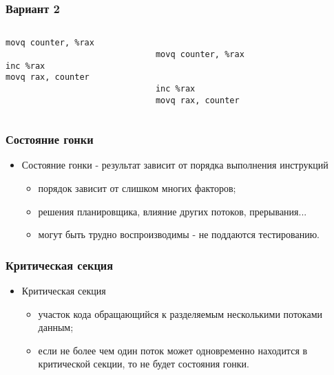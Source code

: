 \begin{frame}[fragile]
\frametitle{Вариант 2}
\begin{columns}
    \begin{column}{.35\textwidth}
        \begin{lstlisting}
movq counter, %rax

inc %rax
movq rax, counter
 
 
        \end{lstlisting}
    \end{column}
    \begin{column}{.35\textwidth}
        \begin{lstlisting}
 
movq counter, %rax
 
 
inc %rax
movq rax, counter
        \end{lstlisting}
    \end{column}
    \begin{column}{.3\textwidth}
    \end{column}
\end{columns}
\end{frame}

\begin{frame}
\frametitle{Состояние гонки}
\begin{itemize}
    \item<1->Состояние гонки - результат зависит от порядка выполнения
         инструкций
    \begin{itemize}
        \item<2->порядок зависит от слишком многих факторов;
        \item<3->решения планировщика, влияние других потоков, прерывания...
        \item<4->могут быть трудно воспроизводимы - не поддаются тестированию.
    \end{itemize}
\end{itemize}
\end{frame}

\begin{frame}
\frametitle{Критическая секция}
\begin{itemize}
    \item<1->Критическая секция
    \begin{itemize}
        \item<2->участок кода обращающийся к разделяемым несколькими потоками
             данным;
        \item<3->если не более чем один поток может одновременно находится в
             критической секции, то не будет состояния гонки.
    \end{itemize}
\end{itemize}
\end{frame}

